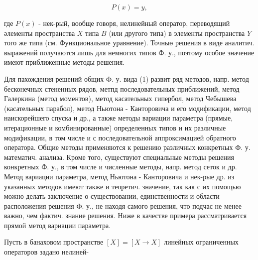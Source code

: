 \documentclass[10pt]{article}
\begin{document}
\[

P(x)=y,

\]



где $P(x)$ - нек-рый, вообще говоря, нелинейный оператор, переводящий әлементы пространства $X$ типа $B$ (или другого типа) в элементы пространства $Y$ того же типа (см. Функциональное уравнение). Точныө решения в виде аналитич. выражений получаются лишь для немногих типов Ф. у., поэтому особое значение имеют приближенные методы решения.



Для пахождения решений общих Ф. у. вида (1) развит ряд методов, напр. метод бесконечных стененных рядов, метпд последовательных приближений, метод Галеркина (метод моментов), метод касательных гипербол, метод Чебышева (касательных парабол), метод Ньютона - Канторовича и его модификации, метод наискорейшего спуска и др., а также методы вариации параметра (прямые, итерационные и комбинированные) определенных типов и их различные модификации, в том числе и с последовательной аппроксимацией обратного оператора. Общие методы применяются к решению различных конкретных Ф. у. математич. анализа. Кроме того, существуют специальные методы решения конкретных Ф. у., в том числе и численные методы, напр. метод сеток и др. Метод вариации параметра, метод Ньютона - Канторовича и нек-рые др. из указанных методов имеют также и теоретич. значение, так как с их помощью можно делать заключение о существовании, единственности и области расположения решения Ф. у., не находя самого решения, что подчас не менее важно, чем фактич. знание решения. Ниже в качестве примера рассматривается прямой метод вариации параметра.



Пусть в банаховом пространстве $[X]=[X \rightarrow X]$ линейных ограниченных операторов задано нелиней-
\end{document}
